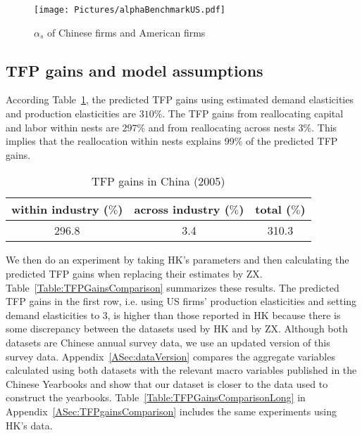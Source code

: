 \documentclass[12pt]{article}
\begin{document}
\begin{figure}[!htbp]
\centering
\texttt{[image: Pictures/alphaBenchmarkUS.pdf]}
\caption{$\alpha_s$ of Chinese firms and American firms}
\label{Figure:alphas}
\end{figure}

\subsection{TFP gains and model assumptions}
According Table~\ref{Table:TFPGainsTotal}, the predicted TFP gains using estimated demand elasticities and production elasticities are $310\%$. The TFP gains from reallocating capital and labor within nests are $297\%$ and from reallocating across nests $3\%$. This implies that the reallocation within nests explains 99\% of the predicted TFP gains. \label{par:ch3betweenAllocation}
\begin{table}[!htbp]
\centering
\caption{TFP gains in China (2005)}
\label{Table:TFPGainsTotal}
\begin{tabular}{ccc}
\hline\hline
within industry ($\%$) & across industry ($\%$) & total ($\%$)\\
\hline
296.8 & 3.4 & 310.3\\
\hline\hline
\end{tabular}
\end{table}

We then do an experiment by taking HK's parameters and then calculating the predicted TFP gains when replacing their estimates by ZX. Table~\ref{Table:TFPGainsComparison} summarizes these results. The predicted TFP gains in the first row, i.e. using US firms' production elasticities and setting demand elasticities to 3, is higher than those reported in HK because there is some discrepancy between the datasets used by HK and by ZX. Although both datasets are Chinese annual survey data, we use an updated version of this survey data. Appendix~\ref{ASec:dataVersion} compares the aggregate variables calculated using both datasets with the relevant macro variables published in the Chinese Yearbooks and show that our dataset is closer to the data used to construct the yearbooks. Table~\ref{Table:TFPGainsComparisonLong} in Appendix~\ref{ASec:TFPgainsComparison} includes the same experiments using HK's data.
\end{document}
